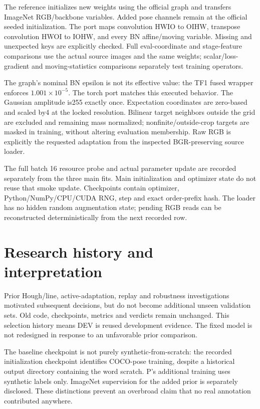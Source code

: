 \documentclass[10pt]{article}
\begin{document}
The reference initializes new weights using the official graph and transfers ImageNet RGB/backbone variables. Added pose channels remain at the official seeded initialization. The port maps convolution HWIO to OIHW, transpose convolution HWOI to IOHW, and every BN affine/moving variable. Missing and unexpected keys are explicitly checked. Full eval-coordinate and stage-feature comparisons use the actual source images and the same weights; scalar/loss-gradient and moving-statistics comparisons separately test training operators.

The graph's nominal BN epsilon is not its effective value: the TF1 fused wrapper enforces $1.001\times10^{-5}$. The torch port matches this executed behavior. The Gaussian amplitude is255 exactly once. Expectation coordinates are zero-based and scaled by4 at the locked resolution. Bilinear target neighbors outside the grid are excluded and remaining mass normalized; nonfinite/outside-crop targets are masked in training, without altering evaluation membership. Raw RGB is explicitly the requested adaptation from the inspected BGR-preserving source loader.

The full batch 16 resource probe and actual parameter update are recorded separately from the three main fits. Main initialization and optimizer state do not reuse that smoke update. Checkpoints contain optimizer, Python/NumPy/CPU/CUDA RNG, step and exact order-prefix hash. The loader has no hidden random augmentation state; pending RGB reads can be reconstructed deterministically from the next recorded row.
\section{Research history and interpretation}
Prior Hough/line, active-adaptation, replay and robustness investigations motivated subsequent decisions, but do not become additional unseen validation sets. Old code, checkpoints, metrics and verdicts remain unchanged. This selection history means DEV is reused development evidence. The fixed model is not redesigned in response to an unfavorable prior comparison.

The baseline checkpoint is not purely synthetic-from-scratch: the recorded initialization checkpoint identifies COCO-pose training, despite a historical output directory containing the word scratch. P's additional training uses synthetic labels only. ImageNet supervision for the added prior is separately disclosed. These distinctions prevent an overbroad claim that no real annotation contributed anywhere.
\end{document}
